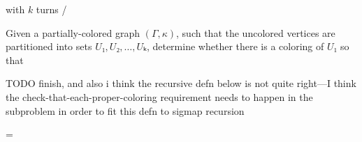 \begin{problem}{ with \(k\) turns / \Col[k]}{}

  Given a partially-colored graph \((Γ,κ)\), such that the uncolored vertices
  are partitioned into sets \(U₁,U₂,\dotsc,Uₖ\), determine whether there is a
  coloring of \(U₁\) so that

  TODO finish, and also i think the recursive defn below is not quite right---I
  think the check-that-each-proper-coloring requirement needs to happen in the
  subproblem in order to fit this defn to sigmap recursion

  \tcblower  
  \Col[k] = 
\end{problem}














%
%
%
%

